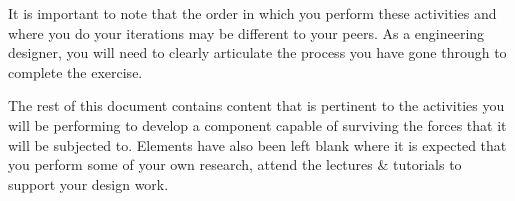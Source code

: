 It is important to note that the order in which you perform these activities and where you do your iterations may be different to your peers. As a engineering designer, you will need to clearly articulate the process you have gone through to complete the exercise.

The rest of this document contains content that is pertinent to the activities you will be performing to develop a component capable of surviving the forces that it will be subjected to. Elements have also been left blank where it is expected that you perform some of your own research, attend the lectures \& tutorials to support your design work.
